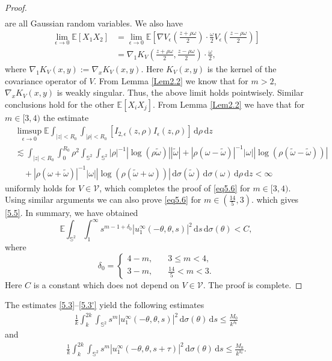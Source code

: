\documentclass[reqno, 12pt]{amsart}
\numberwithin{equation}{section}
\begin{document}
\begin{proof}
\begin{align*}
\end{align*} are all Gaussian random variables. We also have \begin{align*}
	\lim_{\epsilon \to 0}\mathbb E [X_1X_2] &= \lim_{\epsilon \to 0} \mathbb E \left[\nabla V_\epsilon\left(\frac{z+\rho \omega}{2}\right)\cdot \frac{\omega}{2}V_\epsilon\left(\frac{z-\rho\omega}{2}\right)\right]\\ &=\nabla_1 K_V\left(\frac{z+\rho \omega}{2},\frac{z-\rho \omega}{2}\right) \cdot \frac{\omega}{2},
\end{align*}  where $\nabla_1 K_V(x,y):=\nabla_x K_V(x,y)$. Here $K_V(x, y)$ is the kernel of the covariance operator of $V$.
From Lemma \ref{Lem2.2} we know that for $m >2$, $\nabla_x K_V(x,y)$ is weakly singular. Thus, the above limit holds pointwisely. Similar conclusions hold for the other $\mathbb E[X_i X_j] $. From Lemma \ref{Lem2.2} we have that for $m \in [3,4)$ the estimate \begin{align*}
	&\limsup_{\epsilon \to 0} \mathbb E\int_{|z|<R_0} \int_{|\rho|<R_0}[I_{2,\epsilon}(z,\rho)I_{\epsilon}(z,\rho)] \,\mathrm{d}\rho\,\mathrm{d}z\\& \lesssim \int_{|z|<R_0} \int_0^{R_0} \rho^2\int_{\mathbb{S}^2}\int_{\mathbb{S}^2} |\rho|^{-1}|\log{(\rho \tilde{\omega})}||\tilde{\omega}|+|\rho(\omega-\tilde{\omega})|^{-1}|\omega||\log{(\rho(\tilde{\omega}-\tilde{\omega}))}| \\ &\quad+|\rho(\omega+\tilde{\omega})|^{-1}|\omega||\log{(\rho(\tilde{\omega}+\omega))}|\,\mathrm{d}\sigma(\tilde{\omega})\,\mathrm{d}\sigma(\omega)\,\mathrm{d}\rho\,\mathrm{d}z < \infty
\end{align*} uniformly holds for $V \in \mathcal V$, which completes the proof of \eqref{eq5.6} for $m \in [3,4)$. Using similar arguments we can also prove \eqref{eq5.6} for
 $m \in (\frac{14}{5},3)$.
which gives \eqref{5.5}. In summary, we have obtained  \[
\mathbb E \int_{\mathbb{S}^2}\int_1^\infty s^{m-1+\delta_0}|u^\infty_1(-\theta,\theta,s)|^2\,\mathrm{d}s \,\mathrm{d}\sigma(\theta)< C,
\] where \[\delta_0=\begin{cases}
	4-m, &\quad 3 \le m  < 4, \\   3-m, &\quad \frac{14}{5} < m  < 3.\end{cases}\] Here $C $ is a constant which does not depend on $V \in \mathcal V$.
	The proof is complete.
    \end{proof}
    
The estimates \eqref{5.3}--\eqref{5.3'} yield the following estimates 
\begin{align}\label{5.7}
	\frac{1}{k}\int_k^{2k}\int_{\mathbb S^2}s^m|u^\infty_1(-\theta,\theta,s)|^2\,\mathrm{d}\sigma(\theta)\,\mathrm{d}s \le \frac{M_0}{k^{\delta_0}}
\end{align} and \begin{align}\label{5.7'}
	\frac{1}{k}\int_k^{2k}\int_{\mathbb S^2}s^m|u^\infty_1(-\theta,\theta,s+\tau)|^2\,\mathrm{d}\sigma(\theta)\,\mathrm{d}s \le \frac{M_0}{k^{\delta_0}}.
\end{align} 
\end{document}
